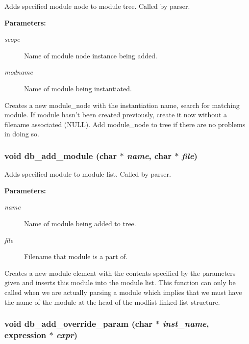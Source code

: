 Adds specified module node to module tree. Called by parser.

\begin{Desc}
\item[{\bf Parameters: }]\par
\begin{description}
\item[
{\em scope}]Name of module node instance being added. \item[
{\em modname}]Name of module being instantiated.

\end{description}
\end{Desc}
Creates a new module\_\-node with the instantiation name, search for matching module. If module hasn't been created previously, create it now without a filename associated (NULL). Add module\_\-node to tree if there are no problems in doing so. 
\subsubsection{\setlength{\rightskip}{0pt plus 5cm}void db\_\-add\_\-module (char $\ast$ {\em name}, char $\ast$ {\em file})}\label{db_8h_a3}


Adds specified module to module list. Called by parser.

\begin{Desc}
\item[{\bf Parameters: }]\par
\begin{description}
\item[
{\em name}]Name of module being added to tree. \item[
{\em file}]Filename that module is a part of.

\end{description}
\end{Desc}
Creates a new module element with the contents specified by the parameters given and inserts this module into the module list. This function can only be called when we are actually parsing a module which implies that we must have the name of the module at the head of the modlist linked-list structure. 
\subsubsection{\setlength{\rightskip}{0pt plus 5cm}void db\_\-add\_\-override\_\-param (char $\ast$ {\em inst\_\-name}, {\bf expression} $\ast$ {\em expr})}\label{db_8h_a5}


